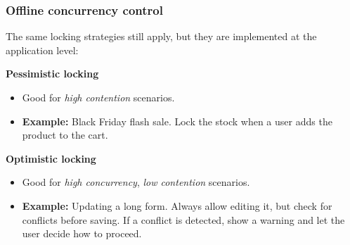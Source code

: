 \documentclass{beamer}
\begin{document}
\begin{frame}
  \frametitle{Offline concurrency control}

  The same locking strategies still apply, but they are implemented at the application level:
  \newline

  \textbf{Pessimistic locking}
  \begin{itemize}
    \item Good for \textit{high contention} scenarios.
    \item \textbf{Example:} Black Friday flash sale. Lock the stock when a user adds the product to the cart.
  \end{itemize}

  \textbf{Optimistic locking}
  \begin{itemize}
    \item Good for \textit{high concurrency}, \textit{low contention} scenarios.
    \item \textbf{Example:} Updating a long form. Always allow editing it, but check for conflicts before saving. If a conflict is detected, show a warning and let the user decide how to proceed.
  \end{itemize}
\end{frame}
\end{document}
